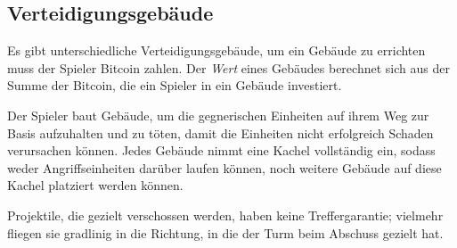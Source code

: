 \subsection{Verteidigungsgebäude}

Es gibt unterschiedliche Verteidigungsgebäude, um ein Gebäude zu errichten muss
der Spieler Bitcoin zahlen. Der \emph{Wert} eines Gebäudes berechnet sich aus
der Summe der Bitcoin, die ein Spieler in ein Gebäude investiert.

Der Spieler baut Gebäude, um die gegnerischen Einheiten auf ihrem Weg zur Basis
aufzuhalten und zu töten, damit die Einheiten nicht erfolgreich Schaden
verursachen können. Jedes Gebäude nimmt eine Kachel vollständig ein, sodass
weder Angriffseinheiten darüber laufen können, noch weitere Gebäude auf diese
Kachel platziert werden können.

Projektile, die gezielt verschossen werden, haben keine Treffergarantie;
vielmehr fliegen sie gradlinig in die Richtung, in die der Turm beim Abschuss
gezielt hat.
